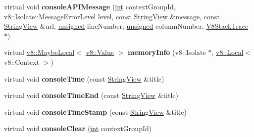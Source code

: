 \begin{DoxyCompactItemize}
\item 
\mbox{\label{classv8__inspector_1_1V8InspectorClient_acac454b61131fecf04f5d7631ddeae86}} 
virtual void {\bfseries console\+A\+P\+I\+Message} (\mbox{\hyperlink{classint}{int}} context\+Group\+Id, v8\+::\+Isolate\+::\+Message\+Error\+Level level, const \mbox{\hyperlink{classv8__inspector_1_1StringView}{String\+View}} \&message, const \mbox{\hyperlink{classv8__inspector_1_1StringView}{String\+View}} \&url, \mbox{\hyperlink{classunsigned}{unsigned}} line\+Number, \mbox{\hyperlink{classunsigned}{unsigned}} column\+Number, \mbox{\hyperlink{classv8__inspector_1_1V8StackTrace}{V8\+Stack\+Trace}} $\ast$)
\item 
\mbox{\label{classv8__inspector_1_1V8InspectorClient_aa0ae6992f007803302cb64d3d0461a20}} 
virtual \mbox{\hyperlink{classv8_1_1MaybeLocal}{v8\+::\+Maybe\+Local}}$<$ \mbox{\hyperlink{classv8_1_1Value}{v8\+::\+Value}} $>$ {\bfseries memory\+Info} (v8\+::\+Isolate $\ast$, \mbox{\hyperlink{classv8_1_1Local}{v8\+::\+Local}}$<$ v8\+::\+Context $>$)
\item 
\mbox{\label{classv8__inspector_1_1V8InspectorClient_a7b0e3b6ae4473671ed80e38153cbcec9}} 
virtual void {\bfseries console\+Time} (const \mbox{\hyperlink{classv8__inspector_1_1StringView}{String\+View}} \&title)
\item 
\mbox{\label{classv8__inspector_1_1V8InspectorClient_a914e850d1e61bfe2fce9f74022ab7a98}} 
virtual void {\bfseries console\+Time\+End} (const \mbox{\hyperlink{classv8__inspector_1_1StringView}{String\+View}} \&title)
\item 
\mbox{\label{classv8__inspector_1_1V8InspectorClient_a2e4593fbf351c48a21006a36db1cc3cd}} 
virtual void {\bfseries console\+Time\+Stamp} (const \mbox{\hyperlink{classv8__inspector_1_1StringView}{String\+View}} \&title)
\item 
\mbox{\label{classv8__inspector_1_1V8InspectorClient_a05b99b6be7f74d53a743e16592d6e38f}} 
virtual void {\bfseries console\+Clear} (\mbox{\hyperlink{classint}{int}} context\+Group\+Id)
\item 

\end{DoxyCompactItemize}
